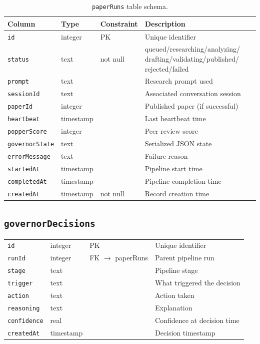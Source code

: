 \begin{longtable}{lllp{4cm}}
\caption{\texttt{paperRuns} table schema.} \label{tab:schema-runs} \\
\toprule
\textbf{Column} & \textbf{Type} & \textbf{Constraint} & \textbf{Description} \\
\midrule
\endfirsthead
\texttt{id} & integer & PK & Unique identifier \\
\texttt{status} & text & not null & queued/researching/analyzing/ drafting/validating/published/ rejected/failed \\
\texttt{prompt} & text & & Research prompt used \\
\texttt{sessionId} & text & & Associated conversation session \\
\texttt{paperId} & integer & & Published paper (if successful) \\
\texttt{heartbeat} & timestamp & & Last heartbeat time \\
\texttt{popperScore} & integer & & Peer review score \\
\texttt{governorState} & text & & Serialized JSON state \\
\texttt{errorMessage} & text & & Failure reason \\
\texttt{startedAt} & timestamp & & Pipeline start time \\
\texttt{completedAt} & timestamp & & Pipeline completion time \\
\texttt{createdAt} & timestamp & not null & Record creation time \\
\bottomrule
\end{longtable}

\subsection{\texttt{governorDecisions}}

\begin{tabular}{lllp{4cm}}
\toprule
\texttt{id} & integer & PK & Unique identifier \\
\texttt{runId} & integer & FK $\to$ paperRuns & Parent pipeline run \\
\texttt{stage} & text & & Pipeline stage \\
\texttt{trigger} & text & & What triggered the decision \\
\texttt{action} & text & & Action taken \\
\texttt{reasoning} & text & & Explanation \\
\texttt{confidence} & real & & Confidence at decision time \\
\texttt{createdAt} & timestamp & & Decision timestamp \\
\bottomrule
\end{tabular}

